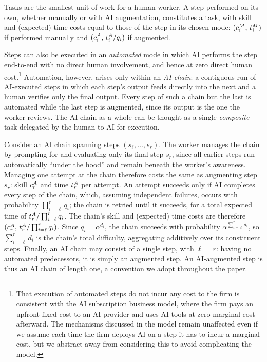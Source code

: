 Tasks are the smallest unit of work for a human worker.
A step performed on its own, whether manually or with AI augmentation, constitutes a task, with skill and (expected) time costs equal to those of the step in its chosen mode: $(c^{M}_{i},\, t^{M}_{i})$ if performed manually and $(c^{A}_{i},\, t^{A}_{i}/q_i)$ if augmented.

Steps can also be executed in an \emph{automated} mode in which AI performs the step end-to-end with no direct human involvement, and hence at zero direct human cost.\footnote{That execution of automated steps do not incur any cost to the firm is consistent with the AI subscription business model, where the firm pays an upfront fixed cost to an AI provider and uses AI tools at zero marginal cost afterward. The mechanisms discussed in the model remain unaffected even if we assume each time the firm deploys AI on a step it has to incur a marginal cost, but we abstract away from considering this to avoid complicating the model.}
Automation, however, arises only within an \emph{AI chain}: a contiguous run of AI-executed steps in which each step's output feeds directly into the next and a human verifies only the final output.
Every step of such a chain but the last is automated while the last step is augmented, since its output is the one the worker reviews.
The AI chain as a whole can be thought as a single \emph{composite} task delegated by the human to AI for execution.

Consider an AI chain spanning steps $(s_\ell, \dotsc, s_r)$.
The worker manages the chain by prompting for and evaluating only its final step $s_r$, since all earlier steps run automatically ``under the hood'' and remain beneath the worker's awareness.
Managing one attempt at the chain therefore costs the same as augmenting step $s_r$: skill $c^{A}_{r}$ and time $t^{A}_{r}$ per attempt.
An attempt succeeds only if AI completes every step of the chain, which, assuming independent failures, occurs with probability $\prod_{i=\ell}^{r} q_i$; the chain is retried until it succeeds, for a total expected time of $t^{A}_{r}/\prod_{i=\ell}^{r} q_i$.
The chain's skill and (expected) time costs are therefore $(c^{A}_{r},\, t^{A}_{r}/\prod_{i=\ell}^{r} q_i)$.
Since $q_i = \alpha^{d_i}$, the chain succeeds with probability $\alpha^{\sum_{i=\ell}^{r} d_i}$, so $\sum_{i=\ell}^{r} d_i$ is the chain's total difficulty, aggregating additively over its constituent steps.
Finally, an AI chain may consist of a single step, with $\ell = r$: having no automated predecessors, it is simply an augmented step.
An AI-augmented step is thus an AI chain of length one, a convention we adopt throughout the paper.

